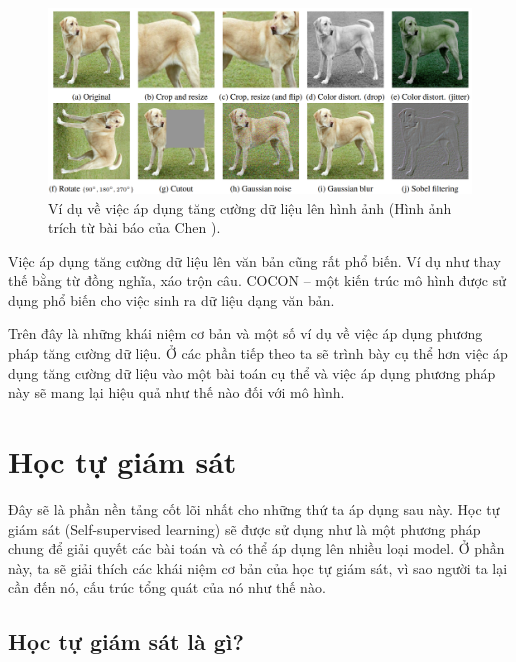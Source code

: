 \begin{figure} [H]
    \centering
    \includegraphics[scale=0.29]{images/Chapter2/example-data-augmentation.png}
    \caption[Ví dụ về việc áp dụng tăng cường dữ liệu lên hình ảnh]{Ví dụ về việc áp dụng tăng cường dữ liệu lên hình ảnh (Hình ảnh trích từ bài báo của Chen \cite{SimCLR}).}
\end{figure}

Việc áp dụng tăng cường dữ liệu lên văn bản cũng rất phổ biến. Ví dụ như thay thế bằng từ đồng nghĩa, xáo trộn câu. COCON \cite{CoCon} -- một kiến trúc mô hình được sử dụng phổ biến cho việc sinh ra dữ liệu dạng văn bản.

Trên đây là những khái niệm cơ bản và một số ví dụ về việc áp dụng phương pháp tăng cường dữ liệu. Ở các phần tiếp theo ta sẽ trình bày cụ thể hơn việc áp dụng tăng cường dữ liệu vào một bài toán cụ thể và việc áp dụng phương pháp này sẽ mang lại hiệu quả như thế nào đối với mô hình.

\section{Học tự giám sát} \label{2.4-ssl}

\noindent Đây sẽ là phần nền tảng cốt lõi nhất cho những thứ ta áp dụng sau này. Học tự giám sát (Self-supervised learning) \cite{ssl-genorcont, ssrl, survey:ssl-for-rec-sys, survey:ssl-from-perspectives, review:ssl-of-GNN} sẽ được sử dụng như là một phương pháp chung để giải quyết các bài toán và có thể áp dụng lên nhiều loại model. Ở phần này, ta sẽ giải thích các khái niệm cơ bản của học tự giám sát, vì sao người ta lại cần đến nó, cấu trúc tổng quát của nó như thế nào. 

\subsection{Học tự giám sát là gì?}

